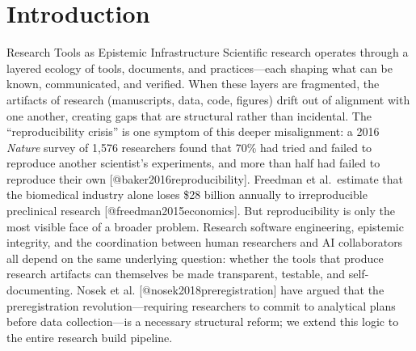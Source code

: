 \documentclass[
  ignorenonframetext,
]{beamer}
\author{\texorpdfstring{}{}}
\date{}
\begin{document}
\section{Introduction}\label{introduction}

\begin{frame}{Research Tools as Epistemic Infrastructure}
\protect{}\label{research-tools-as-epistemic-infrastructure}
Scientific research operates through a layered ecology of tools,
documents, and practices---each shaping what can be known, communicated,
and verified. When these layers are fragmented, the artifacts of
research (manuscripts, data, code, figures) drift out of alignment with
one another, creating gaps that are structural rather than incidental.
The ``reproducibility crisis'' is one symptom of this deeper
misalignment: a 2016 \emph{Nature} survey of 1,576 researchers found
that 70\% had tried and failed to reproduce another scientist's
experiments, and more than half had failed to reproduce their own
{[}@baker2016reproducibility{]}. Freedman et al.~estimate that the
biomedical industry alone loses \$28 billion annually to irreproducible
preclinical research {[}@freedman2015economics{]}. But reproducibility
is only the most visible face of a broader problem. Research software
engineering, epistemic integrity, and the coordination between human
researchers and AI collaborators all depend on the same underlying
question: whether the tools that produce research artifacts can
themselves be made transparent, testable, and self-documenting. Nosek et
al. {[}@nosek2018preregistration{]} have argued that the preregistration
revolution---requiring researchers to commit to analytical plans before
data collection---is a necessary structural reform; we extend this logic
to the entire research build pipeline.


\end{frame}
\end{document}
